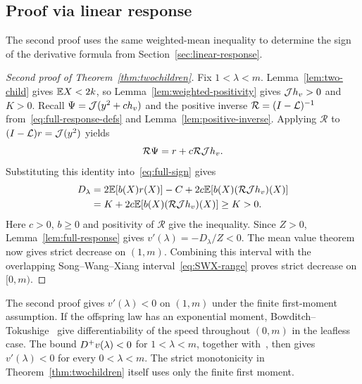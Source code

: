 \subsection{Proof via linear response}\label{sec:two-child-response}
The second proof uses the same weighted-mean inequality to determine the sign of the derivative formula from Section~\ref{sec:linear-response}.

\begin{proof}[Second proof of Theorem~\ref{thm:twochildren}]
Fix $1<\lambda<m$. Lemma~\ref{lem:two-child} gives $\mathbb E X<2k$, so Lemma~\ref{lem:weighted-positivity} gives $\mathcal J h_v>0$ and $K>0$. Recall $\Psi=\mathcal J(y^2+c h_v)$ and the positive inverse $\mathcal R=(I-\mathcal L)^{-1}$ from~\eqref{eq:full-response-defs} and Lemma~\ref{lem:positive-inverse}. Applying $\mathcal R$ to $(I-\mathcal L)r=\mathcal J(y^2)$ yields
\begin{equation}\label{eq:two-child-response}
 \mathcal R\Psi=r+c\mathcal R\mathcal J h_v.
\end{equation}
Substituting this identity into~\eqref{eq:full-sign} gives
\begin{align*}
 D_\lambda
 &=2\mathbb E[b(X)r(X)]-C
   +2c\mathbb E[b(X)(\mathcal R\mathcal J h_v)(X)]\\
 &=K+2c\mathbb E[b(X)(\mathcal R\mathcal J h_v)(X)]\ge K>0.
\end{align*}
Here $c>0$, $b\ge0$ and positivity of $\mathcal R$ give the inequality. Since $Z>0$, Lemma~\ref{lem:full-response} gives $v'(\lambda)=-D_\lambda/Z<0$. The mean value theorem now gives strict decrease on $(1,m)$. Combining this interval with the overlapping Song--Wang--Xiang interval~\eqref{eq:SWX-range} proves strict decrease on $[0,m)$.
\end{proof}

The second proof gives $v'(\lambda)<0$ on $(1,m)$ under the finite first-moment assumption. If the offspring law has an exponential moment, Bowditch--Tokushige~\cite[Theorem~1.1]{BT} give differentiability of the speed throughout $(0,m)$ in the leafless case. The bound $D^{+} v(\lambda)<0$ for $1<\lambda<m$, together with~\cite[Lemma~2.5]{SWX}, then gives $v'(\lambda)<0$ for every $0<\lambda<m$. The strict monotonicity in Theorem~\ref{thm:twochildren} itself uses only the finite first moment.
